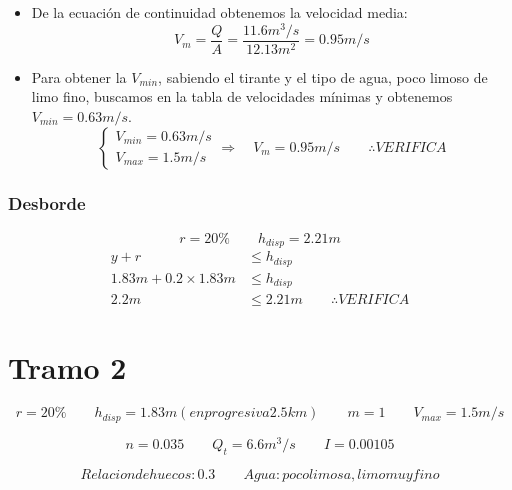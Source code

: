 \documentclass[10.5pt]{article}
\begin{document}
\begin{itemize}
 \item De la ecuación de continuidad obtenemos la velocidad media:
    \begin{equation*}
    V_{m} = \dfrac{Q}{A} = \dfrac{11.6 m^3/s}{12.13 m^2} = 0.95 m/s
    \end{equation*}
 \item Para obtener la $V_{min}$, sabiendo el tirante y el tipo de agua, poco limoso de limo fino, buscamos en
 la tabla de velocidades mínimas y obtenemos $V_{min} = 0.63 m/s$.
    \begin{equation*}
      \begin{cases}
      V_{min} = 0.63 m/s \\
      V_{max} = 1.5 m/s
      \end{cases}
      \Longrightarrow \quad
      V_{m} = 0.95 m/s
      \qquad
      \therefore VERIFICA
    \end{equation*}
\end{itemize}

\subsubsection*{Desborde}

\begin{equation*}
 r = 20\%
 \qquad
 h_{disp} = 2.21 m
\end{equation*}
\begin{align*}
 y + r &\leq h_{disp} \\
 1.83 m + 0.2 \times 1.83 m &\leq h_{disp} \\
 2.2 m &\leq 2.21 m
 \qquad
 \therefore VERIFICA
\end{align*}



\section*{Tramo 2}


\begin{equation*}
  r = 20\%
 \qquad
  h_{disp} = 1.83 m (en progresiva 2.5 km)
 \qquad
  m = 1
 \qquad
  V_{max} = 1.5 m/s
\end{equation*}

\begin{equation*}
  n = 0.035
 \qquad
  Q_{t} = 6.6 m^3/s
 \qquad
  I = 0.00105
\end{equation*}

\begin{equation*}
  Relacion de huecos: 0.3
  \qquad
  Agua: poco limosa, limo muy fino
\end{equation*}
\end{document}
